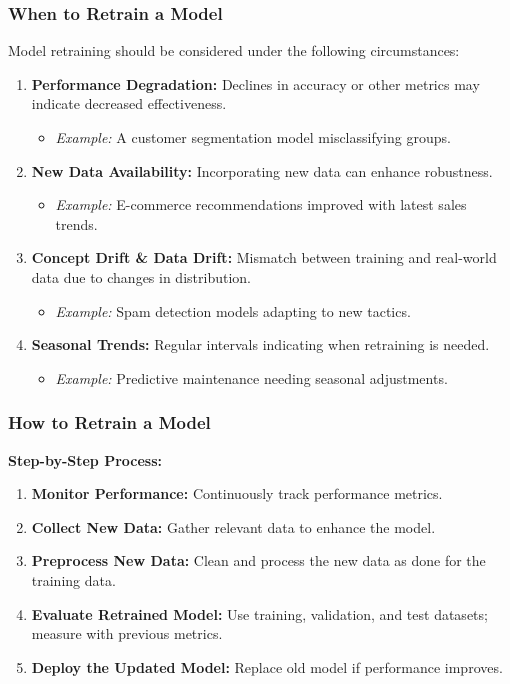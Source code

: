 \documentclass[aspectratio=169]{beamer}
\begin{document}
\begin{frame}[fragile]
    \frametitle{When to Retrain a Model}
    Model retraining should be considered under the following circumstances:
    \begin{enumerate}
        \item \textbf{Performance Degradation:} Declines in accuracy or other metrics may indicate decreased effectiveness.
              \begin{itemize}
                  \item \textit{Example:} A customer segmentation model misclassifying groups.
              \end{itemize}
        \item \textbf{New Data Availability:} Incorporating new data can enhance robustness.
              \begin{itemize}
                  \item \textit{Example:} E-commerce recommendations improved with latest sales trends.
              \end{itemize}
        \item \textbf{Concept Drift \& Data Drift:} Mismatch between training and real-world data due to changes in distribution.
              \begin{itemize}
                  \item \textit{Example:} Spam detection models adapting to new tactics.
              \end{itemize}
        \item \textbf{Seasonal Trends:} Regular intervals indicating when retraining is needed.
              \begin{itemize}
                  \item \textit{Example:} Predictive maintenance needing seasonal adjustments.
              \end{itemize}
    \end{enumerate}
\end{frame}

\begin{frame}[fragile]
    \frametitle{How to Retrain a Model}
    \textbf{Step-by-Step Process:}
    \begin{enumerate}
        \item \textbf{Monitor Performance:} Continuously track performance metrics.
        \item \textbf{Collect New Data:} Gather relevant data to enhance the model.
        \item \textbf{Preprocess New Data:} Clean and process the new data as done for the training data.
        \item \textbf{Evaluate Retrained Model:} Use training, validation, and test datasets; measure with previous metrics.
        \item \textbf{Deploy the Updated Model:} Replace old model if performance improves.
    \end{enumerate}
\end{frame}
\end{document}
